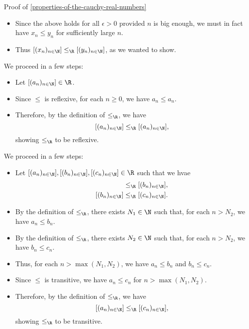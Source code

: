\begin{Proof}{Proof of \cref{properties-of-the-cauchy-real-numbers}}
\begin{itemize}
\begin{align*}
                      &=     y_{n}+(b_{n}-y_{n})+\epsilon\\
                      &\leq  y_{n}+\abs{b_{n}-y_{n}}+\epsilon\\
                      &=     y_{n}+\abs{y_{n}-b_{n}}+\epsilon\\
                      &\lt y_{n}+2\epsilon
            \end{align*}
            for all $n\geq\max(N_{a},N_{b})$.
        \item Since the above holds for all $\epsilon\gt0$ provided $n$ is big enough, we must in fact have $x_{n}\leq y_{n}$ for sufficiently large $n$.
        \item Thus $[(x_{n})_{n\in\N}]\leq_{\R}[(y_{n})_{n\in\N}]$, as we wanted to show.
    \end{itemize}

    We proceed in a few steps:
    \begin{itemize}
        \item Let $[(a_{n})_{n\in\N}]\in\R$.
        \item Since $\leq$ is reflexive, for each $n\geq0$, we have $a_{n}\leq a_{n}$.
        \item Therefore, by the definition of $\leq_{\R}$, we have
            \[
                [(a_{n})_{n\in\N}]%
                \leq_{\R}%
                [(a_{n})_{n\in\N}],%
            \]%
            showing $\leq_{\R}$ to be reflexive.
    \end{itemize}

    We proceed in a few steps:
    \begin{itemize}
        \item Let $[(a_{n})_{n\in\N}],[(b_{n})_{n\in\N}],[(c_{n})_{n\in\N}]\in\R$ such that we hvae
            \begin{align*}
                [(a_{n})_{n\in\N}] &\leq_{\R} [(b_{n})_{n\in\N}],\\
                [(b_{n})_{n\in\N}] &\leq_{\R} [(c_{n})_{n\in\N}].
            \end{align*}
        \item By the definition of $\leq_{\R}$, there exists $N_{1}\in\N$ such that, for each $n\gt N_{2}$, we have $a_{n}\leq b_{n}$.
        \item By the definition of $\leq_{\R}$, there exists $N_{2}\in\N$ such that, for each $n\gt N_{2}$, we have $b_{n}\leq c_{n}$.
        \item Thus, for each $n\gt\max(N_{1},N_{2})$, we have $a_{n}\leq b_{n}$ and $b_{n}\leq c_{n}$.
        \item Since $\leq$ is transitive, we have $a_{n}\leq c_{n}$ for $n\gt\max(N_{1},N_{2})$.
        \item Therefore, by the definition of $\leq_{\R}$, we have
            \[
                [(a_{n})_{n\in\N}]%
                \leq_{\R}%
                [(c_{n})_{n\in\N}],%
            \]%
            showing $\leq_{\R}$ to be transitive.
    \end{itemize}


\end{Proof}

